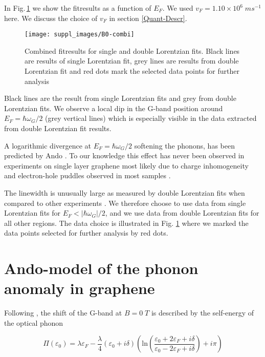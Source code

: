 \documentclass[pra,aps,superscriptaddress,preprint]{revtex4-1}
\begin{document}
\noindent
In Fig.\,\ref{b0-combi} we show the fitresults as a function of $E_F$. We used $v_F = 1.10 \times 10^6 \; ms^{-1}$ here. We discuss the choice of $v_F$ in section \ref{Quant-Descr}.
\noindent
\begin{figure}
   \texttt{[image: suppl\_images/B0-combi]}
   \caption{\label{b0-combi}Combined fitresults for single and double Lorentzian fits. Black lines are results of single Lorentzian fit, grey lines are results from double Lorentzian fit and red dots mark the selected data points for further analysis }
\end{figure}
\noindent
Black lines are the result from single Lorentzian fits and grey from double Lorentzian fits. We observe a local dip in the G-band position around $E_F=\hbar\omega_G/2$ (grey vertical lines) which is especially visible in the data extracted from double Lorentzian fit results.

A logarithmic divergence at $E_F=\hbar\omega_G/2$ softening the phonons, has been predicted by Ando \cite{tsuneya2006anomaly}. 
To our knowledge this effect has never been observed in experiments on single layer graphene most likely due to charge inhomogeneity and electron-hole puddles observed in most samples \cite{yan2007electric,martin2007observation}. 

The linewidth is unusually large as measured by double Lorentzian fits when compared to other experiments \citep{yan2007electric}. We therefore choose to use data from single Lorentzian fits for $E_F<\left|\hbar\omega_G\right|/2$, and we use data from double Lorentzian fits for all other regions. The data choice is illustrated in Fig. \ref{b0-combi} where we marked the data points selected for further analysis by red dots. 

\newpage
\section{Ando-model of the phonon anomaly in graphene}

Following \cite{tsuneya2006anomaly}, the shift of the G-band at $B=0\; T$ is described by the self-energy of the optical phonon

\noindent
\begin{equation}
\label{ando-anomaly}
\Pi(\varepsilon_0) = \lambda \varepsilon_F -\frac{\lambda}{4}\left(\varepsilon_0+i\delta\right)\left(\mathrm{ln}\left(\frac{\varepsilon_0+2\varepsilon_F+i\delta}{\varepsilon_0-2\varepsilon_F+i\delta}\right)+i\pi\right)
\end{equation}
\end{document}
